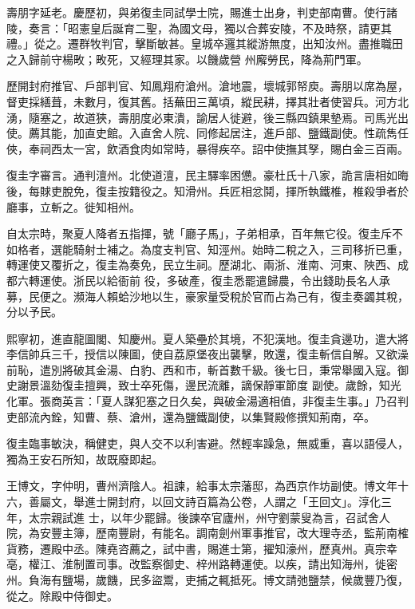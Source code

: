 \begin{pinyinscope}
 壽朋字延老。慶歷初，與弟復圭同試學士院，賜進士出身，判吏部南曹。使行諸陵，奏言：「昭憲皇后誕育二聖，為國文母，獨以合葬安陵，不及時祭，請更其禮。」從之。遷群牧判官，擊斷敏甚。皇城卒邏其縱游無度，出知汝州。盡推職田之入歸前守楊畋；畋死，又經理其家。以饑歲營
 州廨勞民，降為荊門軍。



 歷開封府推官、戶部判官、知鳳翔府滄州。滄地震，壞城郭帑庾。壽朋以席為屋，督吏採繕葺，未數月，復其舊。括蕪田三萬頃，縱民耕，擇其壯者使習兵。河方北湧，隨塞之，故道狹，壽朋度必東潰，諭居人徙避，後三縣四鎮果墊焉。司馬光出使。薦其能，加直史館。入直舍人院、同修起居注，進戶部、鹽鐵副使。性疏雋任俠，奉祠西太一宮，飲酒食肉如常時，暴得疾卒。詔中使撫其孥，賜白金三百兩。



 復圭字審言。通判澶州。北使道澶，民主驛率困憊。豪杜氏十八家，詭言唐相如晦後，每賕吏脫免，復圭按籍役之。知滑州。兵匠相忿鬩，揮所執鐵椎，椎殺爭者於廳事，立斬之。徙知相州。



 自太宗時，聚夏人降者五指揮，號「廳子馬」，子弟相承，百年無它役。復圭斥不如格者，選能騎射士補之。為度支判官、知涇州。始時二稅之入，三司移折已重，轉運使又覆折之，復圭為奏免，民立生祠。歷湖北、兩浙、淮南、河東、陜西、成都六轉運使。浙民以給衙前
 役，多破產，復圭悉罷遣歸農，令出錢助長名人承募，民便之。瀕海人賴蛤沙地以生，豪家量受稅於官而占為己有，復圭奏蠲其稅，分以予民。



 熙寧初，進直龍圖閣、知慶州。夏人築壘於其境，不犯漢地。復圭貪邊功，遣大將李信帥兵三千，授信以陳圖，使自荔原堡夜出襲擊，敗還，復圭斬信自解。又欲澡前恥，遣別將破其金湯、白豹、西和市，斬首數千級。後七日，秉常舉國入寇。御史謝景溫劾復圭擅興，致士卒死傷，邊民流離，謫保靜軍節度
 副使。歲餘，知光化軍。張商英言：「夏人謀犯塞之日久矣，與破金湯適相值，非復圭生事。」乃召判吏部流內銓，知曹、蔡、滄州，還為鹽鐵副使，以集賢殿修撰知荊南，卒。



 復圭臨事敏決，稱健吏，與人交不以利害避。然輕率躁急，無威重，喜以語侵人，獨為王安石所知，故既廢即起。



 王博文，字仲明，曹州濟陰人。祖諫，給事太宗藩邸，為西京作坊副使。博文年十六，善屬文，舉進士開封府，以回文詩百篇為公卷，人謂之「王回文」。淳化三年，太宗親試進
 士，以年少罷歸。後諫卒官廬州，州守劉蒙叟為言，召試舍人院，為安豐主簿，歷南豐尉，有能名。調南劍州軍事推官，改大理寺丞，監荊南榷貨務，遷殿中丞。陳堯咨薦之，試中書，賜進士第，擢知濠州，歷真州。真宗幸亳，權江、淮制置司事。改監察御史、梓州路轉運使。以疾，請出知海州，徙密州。負海有鹽場，歲饑，民多盜鬻，吏捕之輒抵死。博文請弛鹽禁，候歲豐乃復，從之。除殿中侍御史。




\end{pinyinscope}
